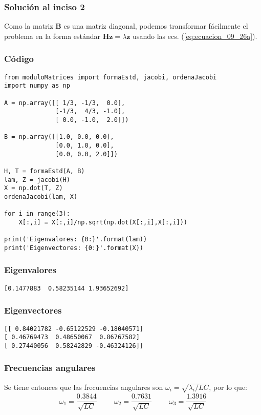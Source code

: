 \documentclass[12pt]{beamer}
\begin{document}
\begin{frame}
\frametitle{Solución al inciso 2}
Como la matriz $\mathbf{B}$ es una matriz diagonal, podemos transformar fácilmente el problema en la forma estándar $\mathbf{H z} = \lambda \mathbf{z}$ usando las ecs. (\ref{eq:ecuacion_09_26a}).
\end{frame}
\begin{frame}
\frametitle{Código}
\begin{lstlisting}[caption=Código completo para resolver el ejercicio]
from moduloMatrices import formaEstd, jacobi, ordenaJacobi
import numpy as np

A = np.array([[ 1/3, -1/3,  0.0],
              [-1/3,  4/3, -1.0],
              [ 0.0, -1.0,  2.0]])

B = np.array([[1.0, 0.0, 0.0],
              [0.0, 1.0, 0.0],
              [0.0, 0.0, 2.0]])

H, T = formaEstd(A, B)
lam, Z = jacobi(H)
X = np.dot(T, Z)
ordenaJacobi(lam, X)

for i in range(3):
    X[:,i] = X[:,i]/np.sqrt(np.dot(X[:,i],X[:,i]))
    
print('Eigenvalores: {0:}'.format(lam))
print('Eigenvectores: {0:}'.format(X))
\end{lstlisting}
\end{frame}
\begin{frame}[fragile]
\frametitle{Eigenvalores}
\fontsize{12}{12}\selectfont
\begin{verbatim}
[0.1477883  0.58235144 1.93652692]
\end{verbatim}
\end{frame}
\begin{frame}[fragile]
\frametitle{Eigenvectores}
\fontsize{12}{12}\selectfont
\begin{verbatim}
[[ 0.84021782 -0.65122529 -0.18040571]
[ 0.46769473  0.48650067  0.86767582]
[ 0.27440056  0.58242829 -0.46324126]]
\end{verbatim}
\end{frame}
\begin{frame}
\frametitle{Frecuencias angulares}
Se tiene entonces que las frecuencias angulares son $\omega_{i} = \sqrt{\lambda_{i}/LC}$, por lo que:
\pause
\begin{align*}
\omega_{1} = \dfrac{0.3844}{\sqrt{LC}} \hspace{1cm} \omega_{2} = \dfrac{0.7631}{\sqrt{LC}} \hspace{1cm} \omega_{3} = \dfrac{1.3916}{\sqrt{LC}}
\end{align*}
\end{frame}
\end{document}
